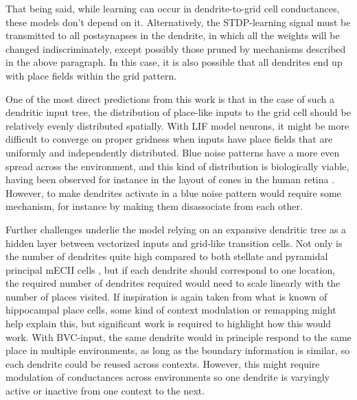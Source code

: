 \documentclass{article}
\begin{document}
    That being said, while learning can occur in dendrite-to-grid cell conductances, these models don't depend on it. Alternatively, the STDP-learning signal must be transmitted to all postsynapses in the dendrite, in which all the weights will be changed indiscriminately, except possibly those pruned by mechanisms described in the above paragraph. In this case, it is also possible that all dendrites end up with place fields within the grid pattern.

    One of the most direct predictions from this work is that in the case of such a dendritic input tree, the distribution of place-like inputs to the grid cell should be relatively evenly distributed spatially. With LIF model neurons, it might be more difficult to converge on proper gridness when inputs have place fields that are uniformly and independently distributed. Blue noise patterns have a more even spread across the environment, and this kind of distribution is biologically viable, having been observed for instance in the layout of cones in the human retina \parencite{Yellott1983}. However, to make dendrites activate in a blue noise pattern would require some mechanism, for instance by making them disassociate from each other.

    Further challenges underlie the model relying on an expansive dendritic tree as a hidden layer between vectorized inputs and grid-like transition cells. Not only is the number of dendrites quite high compared to both stellate and pyramidal principal mECII cells \parencite{Klink1997}, but if each dendrite should correspond to one location, the required number of dendrites required would need to scale linearly with the number of places visited. If inspiration is again taken from what is known of hippocampal place cells, some kind of context modulation or remapping might help explain this, but significant work is required to highlight how this would work. With BVC-input, the same dendrite would in principle respond to the same place in multiple environments, as long as the boundary information is similar, so each dendrite could be reused across contexts. However, this might require modulation of conductances across environments so one dendrite is varyingly active or inactive from one context to the next.
\end{document}
